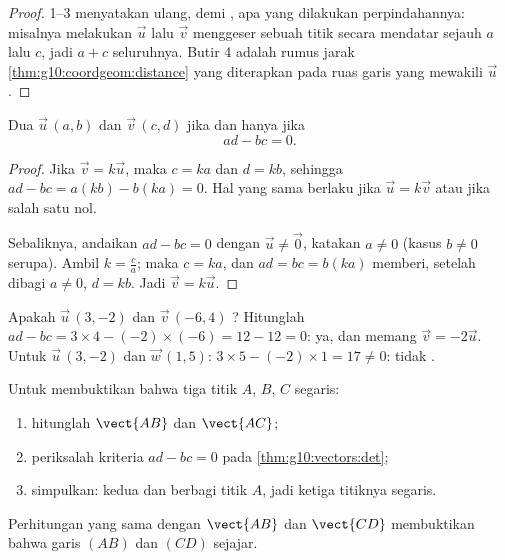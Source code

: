 \begin{proof}
1--3 menyatakan ulang,  demi , apa yang dilakukan
perpindahannya: misalnya melakukan $\vec u$ lalu $\vec v$ menggeser sebuah
titik secara mendatar sejauh $a$ lalu $c$, jadi $a + c$ seluruhnya. Butir 4
adalah rumus jarak \cref{thm:g10:coordgeom:distance} yang diterapkan pada
ruas garis yang mewakili $\vec u$.
\end{proof}

\begin{theorem}\label{thm:g10:vectors:det}
Dua  $\vec u\,(a, b)$ dan $\vec v\,(c, d)$  jika dan
hanya jika
\[
ad - bc = 0 .
\]
\end{theorem}

\begin{proof}
Jika $\vec v = k\vec u$, maka $c = ka$ dan $d = kb$, sehingga
$ad - bc = a(kb) - b(ka) = 0$. Hal yang sama berlaku jika $\vec u = k \vec v$
atau jika salah satu  nol.

Sebaliknya, andaikan $ad - bc = 0$ dengan $\vec u \neq \vec 0$, katakan
$a \neq 0$ (kasus $b \neq 0$ serupa). Ambil $k = \frac{c}{a}$; maka
$c = ka$, dan $ad = bc = b(ka)$ memberi, setelah dibagi $a \neq 0$,
$d = kb$. Jadi $\vec v = k\vec u$.
\end{proof}

\begin{example}\label{ex:g10:vectors:det}
Apakah $\vec u\,(3, -2)$ dan $\vec v\,(-6, 4)$ ? Hitunglah
$ad - bc = 3 \times 4 - (-2)\times(-6) = 12 - 12 = 0$: ya, dan memang
$\vec v = -2\vec u$. Untuk $\vec u\,(3, -2)$ dan $\vec w\,(1, 5)$:
$3 \times 5 - (-2) \times 1 = 17 \neq 0$: tidak .
\end{example}

\begin{method}\label{met:g10:vectors:alignment}
Untuk membuktikan bahwa tiga titik $A$, $B$, $C$ segaris:
\begin{enumerate}
  \item hitunglah  $\vect{AB}$ dan $\vect{AC}$;
  \item periksalah kriteria $ad - bc = 0$ pada \cref{thm:g10:vectors:det};
  \item simpulkan: kedua   dan berbagi titik $A$, jadi
        ketiga titiknya segaris.
\end{enumerate}
Perhitungan yang sama dengan $\vect{AB}$ dan $\vect{CD}$ membuktikan bahwa
garis $(AB)$ dan $(CD)$ sejajar.
\end{method}

